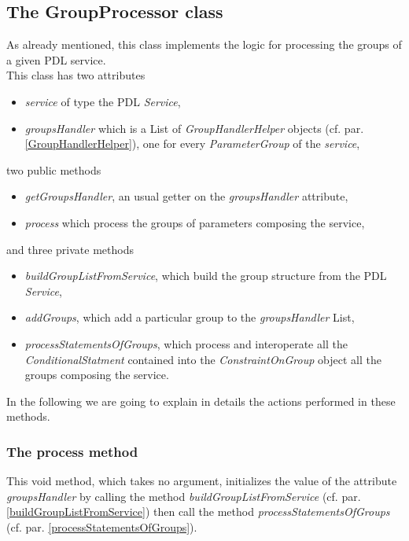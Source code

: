 \documentclass[a4paper,11pt] {ivoa}
\begin{document}
\subsection{The GroupProcessor class}
As already mentioned, this class implements the logic for processing the groups of a given PDL service.\\
This class has two attributes 
\begin{itemize}
\item {\it service} of type the PDL {\it Service},
\item {\it groupsHandler} which is a List of {\it GroupHandlerHelper} objects  (cf. par. \ref{GroupHandlerHelper}), one for every {\it ParameterGroup} of the {\it service},
\end{itemize}
two public methods
\begin{itemize}
\item {\it getGroupsHandler}, an usual getter on the {\it groupsHandler} attribute,
\item  {\it process} which process the groups of parameters composing the service, 
\end{itemize}
and three private methods
\begin{itemize}
\item {\it buildGroupListFromService}, which build the group structure from the PDL {\it Service},
\item {\it addGroups}, which add a particular group to the  {\it groupsHandler} List,
\item {\it processStatementsOfGroups}, which process and interoperate all the {\it ConditionalStatment} contained into the {\it ConstraintOnGroup} object all the groups composing the service.
\end{itemize}
In the following we are going to explain in details the actions performed in these methods.

\subsubsection{The process method}\label{process}
This void method, which takes no argument, initializes the value of the attribute {\it groupsHandler} by calling the method 
{\it buildGroupListFromService} (cf. par. \ref{buildGroupListFromService}) then call the method {\it processStatementsOfGroups} (cf. par. \ref{processStatementsOfGroups}).
 
\end{document}
